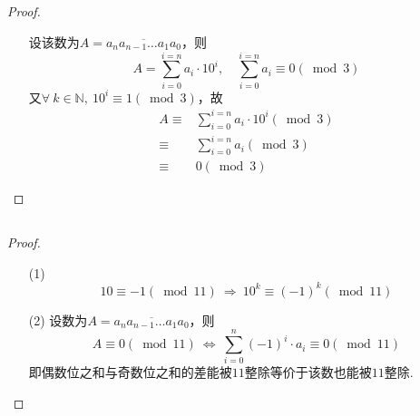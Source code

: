 \documentclass[UTF8]{ctexart}
\begin{document}
\subsection{}   %
\begin{proof}
    \begin{enumerate}
        \item []
        \item []设该数为$A=\overline{a_n a_{n-1} \ldots a_1 a_0}$，则
        \[
            A=\sum\limits_{i=0}^{i=n} a_i\cdot 10^{i},\quad
            \sum\limits_{i=0}^{i=n} a_i \equiv 0 (\bmod 3)
        \]
        又$\forall\ k\in \mathbb{N},\ 10^{i} \equiv 1 (\bmod 3)$，故
        \begin{align*}
            A 
            \equiv & \sum\limits_{i=0}^{i=n} a_i\cdot 10^{i} (\bmod 3)\\
            \equiv & \sum\limits_{i=0}^{i=n} a_i(\bmod 3)\\
            \equiv & 0(\bmod 3)
        \end{align*}
    \end{enumerate}
\end{proof}

\subsection{}   %
\begin{proof}
    \begin{enumerate}
        \item []
        \item [(1)]
        \[
            10 \equiv -1 (\bmod 11)
            \ \Rightarrow\ 
            10^k \equiv {(-1)}^{k} (\bmod 11)
        \]
        \item [(2)]设数为$A=\overline{a_n a_{n-1} \ldots a_1 a_0}$，则
        \[
            A \equiv 0 (\bmod 11)
            \ \Leftrightarrow\ 
            \sum\limits_{i=0}^{n} {(-1)}^{i} \cdot a_i 
            \equiv 0 (\bmod 11)
        \]
        即偶数位之和与奇数位之和的差能被$11$整除等价于该数也能被$11$整除.
    \end{enumerate}
\end{proof}
\end{document}
